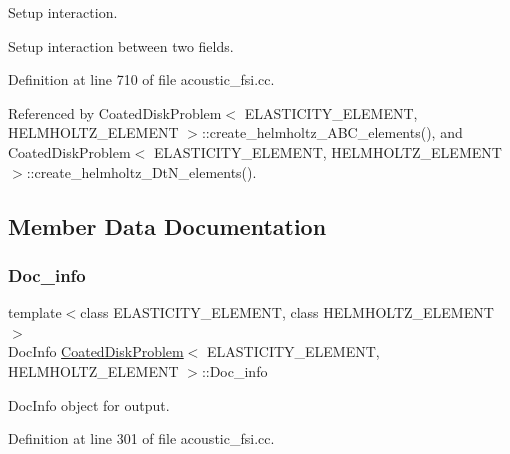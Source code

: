 Setup interaction. 

Setup interaction between two fields. 

Definition at line 710 of file acoustic\+\_\+fsi.\+cc.



Referenced by Coated\+Disk\+Problem$<$ E\+L\+A\+S\+T\+I\+C\+I\+T\+Y\+\_\+\+E\+L\+E\+M\+E\+N\+T, H\+E\+L\+M\+H\+O\+L\+T\+Z\+\_\+\+E\+L\+E\+M\+E\+N\+T $>$\+::create\+\_\+helmholtz\+\_\+\+A\+B\+C\+\_\+elements(), and Coated\+Disk\+Problem$<$ E\+L\+A\+S\+T\+I\+C\+I\+T\+Y\+\_\+\+E\+L\+E\+M\+E\+N\+T, H\+E\+L\+M\+H\+O\+L\+T\+Z\+\_\+\+E\+L\+E\+M\+E\+N\+T $>$\+::create\+\_\+helmholtz\+\_\+\+Dt\+N\+\_\+elements().



\subsection{Member Data Documentation}
\mbox{\label{classCoatedDiskProblem_ab389fe08ad443c10ddbdd12127903477}} 
\subsubsection{\texorpdfstring{Doc\+\_\+info}{Doc\_info}}
{\footnotesize\ttfamily template$<$class E\+L\+A\+S\+T\+I\+C\+I\+T\+Y\+\_\+\+E\+L\+E\+M\+E\+NT, class H\+E\+L\+M\+H\+O\+L\+T\+Z\+\_\+\+E\+L\+E\+M\+E\+NT$>$ \\
Doc\+Info \hyperlink{classCoatedDiskProblem}{Coated\+Disk\+Problem}$<$ E\+L\+A\+S\+T\+I\+C\+I\+T\+Y\+\_\+\+E\+L\+E\+M\+E\+NT, H\+E\+L\+M\+H\+O\+L\+T\+Z\+\_\+\+E\+L\+E\+M\+E\+NT $>$\+::Doc\+\_\+info\hspace{0.3cm}{\ttfamily [private]}}



Doc\+Info object for output. 



Definition at line 301 of file acoustic\+\_\+fsi.\+cc.

\mbox{\label{classCoatedDiskProblem_aefeabd04f0fd48be258e57a8b73038b4}} 
